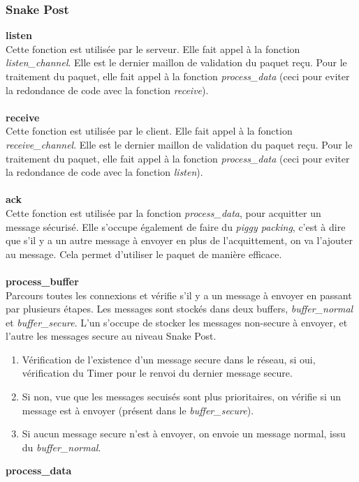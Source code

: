 \documentclass[a4paper]{article}
\begin{document}
\subsubsection{Snake Post}
\textbf{listen}\\
Cette fonction est utilisée par le serveur. Elle fait appel à la fonction \textit{listen\_channel}. Elle est le dernier maillon de validation du paquet reçu.
Pour le traitement du paquet, elle fait appel à la fonction \textit{process\_data} (ceci pour eviter la redondance de code avec la fonction \textit{receive}).\\\\
\textbf{receive}\\
Cette fonction est utilisée par le client. Elle fait appel à la fonction \textit{receive\_channel}. Elle est le dernier maillon de validation du paquet reçu.
Pour le traitement du paquet, elle fait appel à la fonction \textit{process\_data} (ceci pour eviter la redondance de code avec la fonction \textit{listen}).\\\\
\textbf{ack}\\
Cette fonction est utilisée par la fonction \textit{process\_data}, pour acquitter un message sécurisé.
Elle s'occupe également de faire du \textit{piggy packing}, c'est à dire que s'il y a un autre message à envoyer en plus de l'acquittement, on va l'ajouter
au message. Cela permet d'utiliser le paquet de manière efficace.\\\\
\textbf{process\_buffer}\\
Parcours toutes les connexions et vérifie s'il y a un message à envoyer en passant par plusieurs étapes.
Les messages sont stockés dans deux buffers, \textit{buffer\_normal} et \textit{buffer\_secure}.
L'un s'occupe de stocker les messages non-secure à envoyer, et l'autre les messages secure au niveau Snake Post.
\begin{enumerate}
\item Vérification de l'existence d'un message secure dans le réseau, si oui, vérification du Timer pour le renvoi du dernier message secure.
\item Si non, vue que les messages secuisés sont plus prioritaires, on vérifie si un message est à envoyer (présent dans le \textit{buffer\_secure}).
\item Si aucun message secure n'est à envoyer, on envoie un message normal, issu du \textit{buffer\_normal}.
\end{enumerate}
\textbf{process\_data}\\
\end{document}
